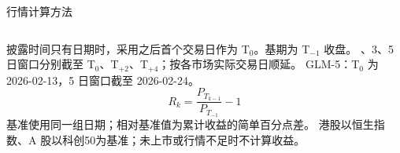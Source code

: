 \begin{frame}{行情计算方法}\relax
{}
\begin{columns}[T,onlytextwidth]
披露时间只有日期时，采用之后首个交易日作为 T$_0$。基期为 T$_{-1}$ 收盘。
、3、5 日窗口分别截至 T$_0$、T$_{+2}$、T$_{+4}$；按各市场实际交易日顺延。
\Gap
GLM-5：T$_0$ 为 2026-02-13，5 日窗口截至 2026-02-24。
\[
  R_k=\frac{P_{T_{k-1}}}{P_{T_{-1}}}-1
\]
基准使用同一组日期；相对基准值为累计收益的简单百分点差。
\Gap
港股以恒生指数、A 股以\mbox{科创50}为基准；未上市或行情不足时不计算收益。
\end{columns}
\end{frame}
